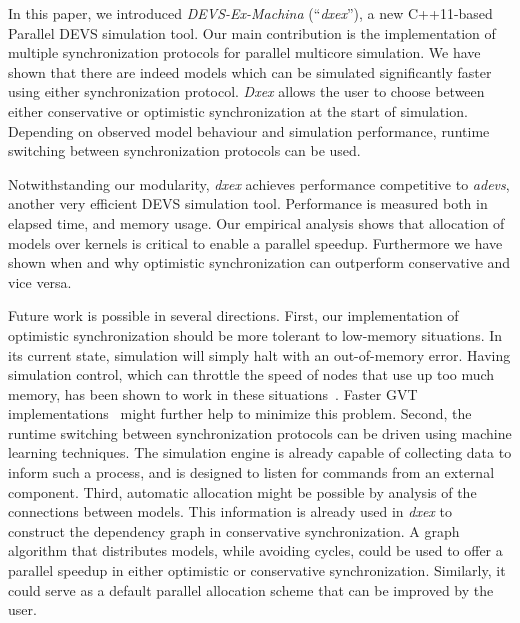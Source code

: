 In this paper, we introduced \textit{DEVS-Ex-Machina} (``\textit{dxex}''), a new C++11-based \textsf{Parallel DEVS} simulation tool.
Our main contribution is the implementation of multiple synchronization protocols for parallel multicore simulation.
We have shown that there are indeed models which can be simulated significantly faster using either synchronization protocol.
\textit{Dxex} allows the user to choose between either conservative or optimistic synchronization at the start of simulation.
Depending on observed model behaviour and simulation performance, runtime switching between synchronization protocols can be used.

Notwithstanding our modularity, \textit{dxex} achieves performance competitive to \textit{adevs}, another very efficient \textsf{DEVS} simulation tool.
Performance is measured both in elapsed time, and memory usage.
Our empirical analysis shows that allocation of models over kernels is critical to enable a parallel speedup. Furthermore we have shown when and why optimistic synchronization can outperform conservative and vice versa.

Future work is possible in several directions.
First, our implementation of optimistic synchronization should be more tolerant to low-memory situations.
In its current state, simulation will simply halt with an out-of-memory error.
Having simulation control, which can throttle the speed of nodes that use up too much memory, has been shown to work in these situations~\cite{FujimotoBook}.
Faster GVT implementations~\cite{Fujimoto:1997:CGV:268403.268404,Bauer:2005:SND:1069810.1070159} might further help to minimize this problem.
Second, the runtime switching between synchronization protocols can be driven using machine learning techniques.
The simulation engine is already capable of collecting data to inform such a process, and is designed to listen for commands from an external component.
Third, automatic allocation might be possible by analysis of the connections between models.
This information is already used in \textit{dxex} to construct the dependency graph in conservative synchronization.
A graph algorithm that distributes models, while avoiding cycles, could be used to offer a parallel speedup in either optimistic or conservative synchronization.
Similarly, it could serve as a default parallel allocation scheme that can be improved by the user.
